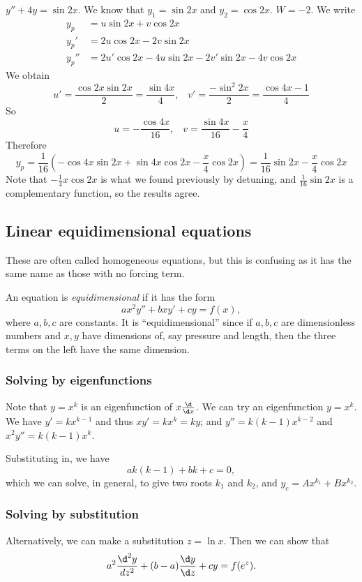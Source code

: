 \documentclass[a4paper]{article}
\begin{document}
\begin{eg}
  $y'' + 4y = \sin 2x$. We know that $y_1 = \sin 2x$ and $y_2 = \cos 2x$. $W = -2$. We write
\begin{align*}
  y_p &= u\sin 2x + v\cos 2x\\
  y_p' &= 2u\cos 2x - 2v\sin 2x\\
  y_p'' &= 2u'\cos 2x - 4u\sin 2x - 2v' \sin 2x - 4v\cos 2x
\end{align*}
We obtain 
\[
u' = \frac{\cos 2x\sin 2x}{2} = \frac{\sin 4x}{4},\;\;\; v' = \frac{-\sin^2 2x}{2} = \frac{\cos 4x - 1}{4}
\]
So 
\[
u = -\frac{\cos 4x}{16}, \;\;\; v = \frac{\sin 4x}{16} - \frac{x}{4}
\]
Therefore
\[
y_p = \frac{1}{16}(-\cos 4x\sin 2x + \sin 4x\cos 2x - \frac{x}{4}\cos 2x) = \frac{1}{16}\sin 2x - \frac{x}{4}\cos 2x
\]
Note that $-\frac{1}{4}x\cos 2x$ is what we found previously by detuning, and $\frac{1}{16}\sin 2x$ is a complementary function, so the results agree.
\end{eg}

\subsection{Linear equidimensional equations}
\note These are often called homogeneous equations, but this is confusing as it has the same name as those with no forcing term.

\begin{defi}
  An equation is \emph{equidimensional} if it has the form
  \[
  ax^2y'' + bxy' + cy = f(x),
  \]
  where $a, b, c$ are constants. It is ``equidimensional'' since if $a, b, c$ are dimensionless numbers and $x, y$ have dimensions of, say pressure and length, then the three terms on the left have the same dimension.
\end{defi}

\subsubsection{Solving by eigenfunctions}
Note that $y = x^k$ is an eigenfunction of $x\frac{\d}{\d x}$. We can try an eigenfunction $y = x^k$. We have $y' = kx^{k - 1}$ and thus $xy' = kx^k = ky$; and $y'' = k(k - 1)x^{k - 2}$ and $x^2y'' = k(k - 1)x^k$.

Substituting in, we have
\[
ak(k - 1) + bk + c = 0,
\]
which we can solve, in general, to give two roots $k_1$ and $k_2$, and $y_c = Ax^{k_1} + Bx^{k_2}$.

\subsubsection{Solving by substitution}
Alternatively, we can make a substitution $z = \ln x$. Then we can show that 
\[
a^2\frac{\d ^2 y}{d z^2} + (b - a)\frac{\d y}{\d z} + cy = f(e^z).
\]
\end{document}
